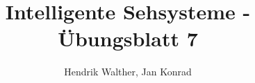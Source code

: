 \documentclass[deutsch]{llncs}
\begin{document}
\title{Intelligente Sehsysteme - Übungsblatt 7}


\author{Hendrik Walther, Jan Konrad}
\institute{}
\maketitle

\end{document}
